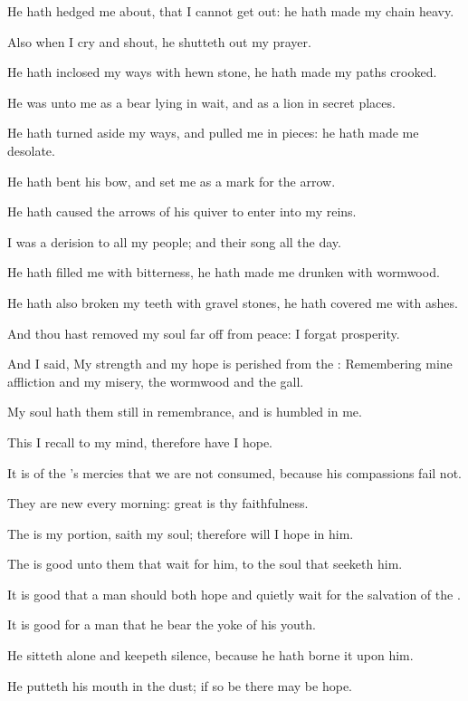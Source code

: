 \Verse He hath hedged me about, that I cannot get out: he hath made my chain heavy.

\Verse Also when I cry and shout, he shutteth out my prayer.

\Verse He hath inclosed my ways with hewn stone, he hath made my paths crooked.

\Verse He was unto me as a bear lying in wait, and as a lion in secret places.

\Verse He hath turned aside my ways, and pulled me in pieces: he hath made me desolate.

\Verse He hath bent his bow, and set me as a mark for the arrow.

\Verse He hath caused the arrows of his quiver to enter into my reins.

\Verse I was a derision to all my people; and their song all the day.

\Verse He hath filled me with bitterness, he hath made me drunken with wormwood.

\Verse He hath also broken my teeth with gravel stones, he hath covered me with ashes.

\Verse And thou hast removed my soul far off from peace: I forgat prosperity.

\Verse And I said, My strength and my hope is perished from the \LORD: \Verse Remembering mine affliction and my misery, the wormwood and the gall.

\Verse My soul hath them still in remembrance, and is humbled in me.

\Verse This I recall to my mind, therefore have I hope.

\Verse It is of the \LORD's mercies that we are not consumed, because his compassions fail not.

\Verse They are new every morning: great is thy faithfulness.

\Verse The \LORD is my portion, saith my soul; therefore will I hope in him.

\Verse The \LORD is good unto them that wait for him, to the soul that seeketh him.

\Verse It is good that a man should both hope and quietly wait for the salvation of the \LORD.

\Verse It is good for a man that he bear the yoke of his youth.

\Verse He sitteth alone and keepeth silence, because he hath borne it upon him.

\Verse He putteth his mouth in the dust; if so be there may be hope.

